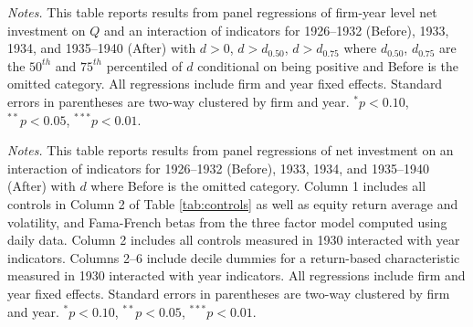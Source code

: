\begin{table}[p]\centering
\caption{\\ Gold clause exposure at the extensive margin and investment} 
\scriptsize \label{tabapp:invnonlinear}
\renewcommand{\arraystretch}{1.15}



\vspace*{3mm} \justifying \noindent
\footnotesize{\textit{Notes.} This table reports results from panel regressions of firm-year level net investment on $Q$ and an interaction of indicators for 1926--1932 (Before), 1933, 1934, and 1935--1940 (After) with  $d > 0$, $d>d_{0.50}$, $d>d_{0.75}$ where $d_{0.50}$, $d_{0.75}$ are the $50^{th}$ and $75^{th}$ percentiled of $d$ conditional on being positive and Before is the omitted category. All regressions include firm and year fixed effects. Standard errors in parentheses are two-way clustered by firm and year. $^{*}p<0.10$, $^{**}p<0.05$, $^{***}p<0.01$.}


\end{table}

\begin{table}[p]\centering
\caption{\\ Gold clauses exposure and investment with return-based controls}
\scriptsize \label{tabapp:retcontrol}
\renewcommand{\arraystretch}{1.15}
\def\sym#1{\ifmmode^{#1}\else\(^{#1}\)\fi}



\vspace*{3mm} \justifying \noindent
\footnotesize{\textit{Notes.} This table reports results from panel regressions of net investment on an interaction of indicators for 1926--1932 (Before), 1933, 1934, and 1935--1940 (After) with $d$ where Before is the omitted category. Column 1  includes all controls in Column 2 of Table \ref{tab:controls} as well as equity return average and volatility, and Fama-French betas from the three factor model computed using daily data. Column 2 includes all controls measured in 1930 interacted with year indicators. Columns 2--6 include decile dummies for a return-based characteristic measured in 1930 interacted with year indicators. All regressions include firm and year fixed effects. Standard errors in parentheses are two-way clustered by firm and year. $^{*}p<0.10$, $^{**}p<0.05$, $^{***}p<0.01$.}

\end{table}